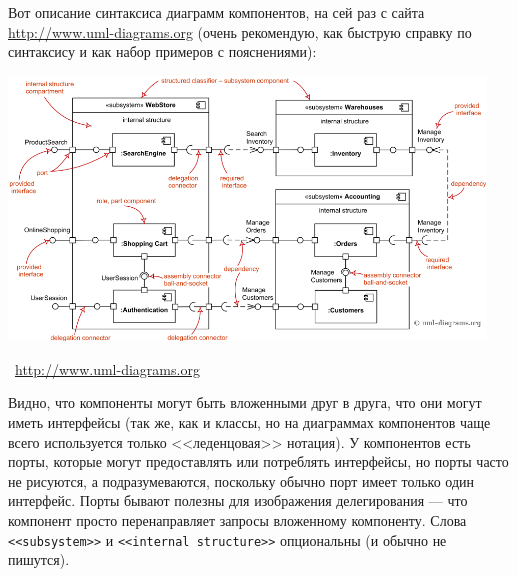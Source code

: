 \documentclass[a5paper]{article}
\newcommand{\attribution}[1] {
    \vspace{-5mm}\begin{flushright}\begin{scriptsize}%
    {\textcopyright\, #1}\end{scriptsize}\end{flushright}
}
\begin{document}
Вот описание синтаксиса диаграмм компонентов, на сей раз с сайта \url{http://www.uml-diagrams.org} (очень рекомендую, как быструю справку по синтаксису и как набор примеров с пояснениями):

\begin{center}
    \includegraphics[width=0.95\textwidth]{componentDiagramsOverview.png}
    \attribution{\url{http://www.uml-diagrams.org}}
\end{center}

Видно, что компоненты могут быть вложенными друг в друга, что они могут иметь интерфейсы (так же, как и классы, но на диаграммах компонентов чаще всего используется только <<леденцовая>> нотация). У компонентов есть порты, которые могут предоставлять или потреблять интерфейсы, но порты часто не рисуются, а подразумеваются, поскольку обычно порт имеет только один интерфейс. Порты бывают полезны для изображения делегирования --- что компонент просто перенаправляет запросы вложенному компоненту. Слова \verb|<<subsystem>>| и \verb|<<internal structure>>| опциональны (и обычно не пишутся).
\end{document}
